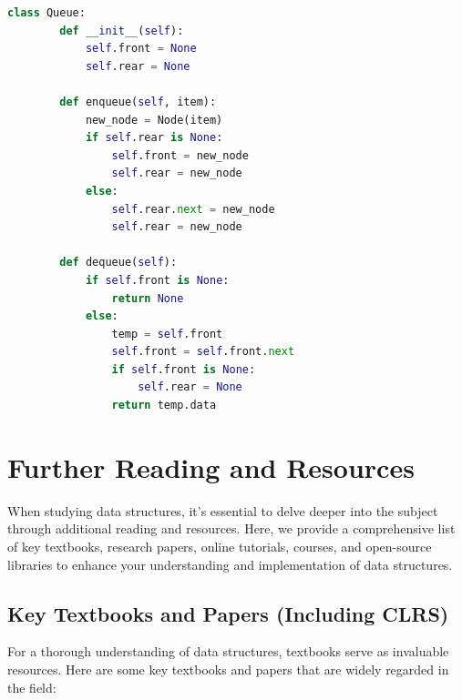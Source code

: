 \documentclass[12pt]{book} %
\begin{document}
\begin{itemize}
\begin{lstlisting}[language=Python, caption=Queue Implementation in Python using Linked Lists]
    class Queue:
        def __init__(self):
            self.front = None
            self.rear = None
        
        def enqueue(self, item):
            new_node = Node(item)
            if self.rear is None:
                self.front = new_node
                self.rear = new_node
            else:
                self.rear.next = new_node
                self.rear = new_node
        
        def dequeue(self):
            if self.front is None:
                return None
            else:
                temp = self.front
                self.front = self.front.next
                if self.front is None:
                    self.rear = None
                return temp.data
    \end{lstlisting}
    \FloatBarrier

\end{itemize}

\section{Further Reading and Resources}

When studying data structures, it's essential to delve deeper into the subject through additional reading and resources. Here, we provide a comprehensive list of key textbooks, research papers, online tutorials, courses, and open-source libraries to enhance your understanding and implementation of data structures.

\subsection{Key Textbooks and Papers (Including CLRS)}

For a thorough understanding of data structures, textbooks serve as invaluable resources. Here are some key textbooks and papers that are widely regarded in the field:
\end{document}

